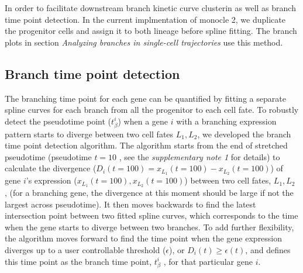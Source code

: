 \documentclass[10pt,oneside]{article}\usepackage[]{graphicx}\usepackage[]{color}
\begin{document}
In order to facilitate  downstream branch kinetic curve clusterin as well as branch time point detection. In the current implmentation of monocle 2, we duplicate the progenitor cells and assign it to both lineage before spline fitting. The branch plots in section \emph{Analyzing branches in single-cell trajectories} use this method.

\subsection{Branch time point detection}\label{branchtime}
The branching time point for each gene can be quantified by fitting a separate spline curves for each branch from all the progenitor to each cell fate. To robustly detect the pseudotime point ($t_\beta^i$) when a gene $i$ with a branching expression pattern starts to diverge between two cell fates $L_1, L_2$, we developed the branch time point detection algorithm. The algorithm starts from the end of stretched pseudotime (pseudotime $t = 10$ , see the \emph{supplementary note 1} for details) to calculate the divergence ($D_i(t = 100) = x_{L_1}(t = 100) - x_{L_2}(t = 100)$) of gene $i$'s expression ($x_{L_1}(t = 100), x_{L_2}(t = 100)$) between two cell fates, $L_1, L_2$ , (for a branching gene, the divergence at this moment should be large if not the largest across pseudotime). It then moves backwards to find the latest intersection point between two fitted spline curves, which corresponds to the time when the gene starts to diverge between two branches. To add further flexibility, the algorithm moves forward to find the time point when the gene expression diverges up to a user controllable threshold ($\epsilon$), or $D_i(t) \geq \epsilon (t)$, and defines this time point as the branch time point, $t_{\beta}^i$ , for that particular gene $i$.  
%  
%  
 
\end{document}
